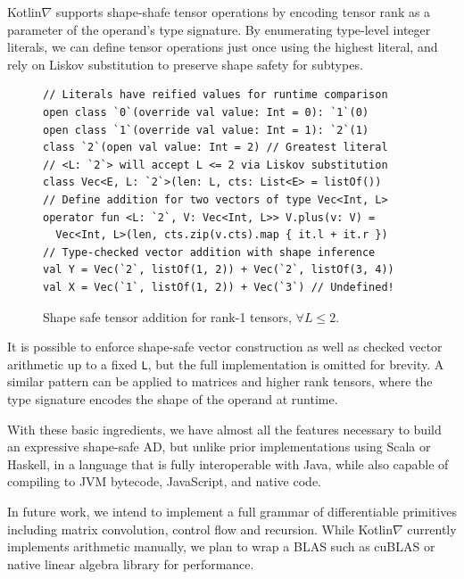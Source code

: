 \documentclass[12pt,initial,twoside,maitrise]{dms}
\numberwithin{equation}{section}
\numberwithin{table}{chapter}
\numberwithin{figure}{chapter}
\begin{document}
 Kotlin$\nabla$ supports shape-shafe tensor operations by encoding tensor rank as a parameter of the operand's type signature. By enumerating type-level integer literals, we can define tensor operations just once using the highest literal, and rely on Liskov substitution to preserve shape safety for subtypes.

\begin{figure}[!htb]
\begin{verbatim}
// Literals have reified values for runtime comparison
open class `0`(override val value: Int = 0): `1`(0)
open class `1`(override val value: Int = 1): `2`(1)
class `2`(open val value: Int = 2) // Greatest literal
// <L: `2`> will accept L <= 2 via Liskov substitution
class Vec<E, L: `2`>(len: L, cts: List<E> = listOf())
// Define addition for two vectors of type Vec<Int, L>
operator fun <L: `2`, V: Vec<Int, L>> V.plus(v: V) =
  Vec<Int, L>(len, cts.zip(v.cts).map { it.l + it.r })
// Type-checked vector addition with shape inference
val Y = Vec(`2`, listOf(1, 2)) + Vec(`2`, listOf(3, 4))
val X = Vec(`1`, listOf(1, 2)) + Vec(`3`) // Undefined!
\end{verbatim}
\caption{Shape safe tensor addition for rank-1 tensors, $\forall L\leq2.$}
\end{figure}

It is possible to enforce shape-safe vector construction as well as checked vector arithmetic up to a fixed \texttt{L}, but the full implementation is omitted for brevity. A similar pattern can be applied to matrices and higher rank tensors, where the type signature encodes the shape of the operand at runtime.

With these basic ingredients, we have almost all the features necessary to build an expressive shape-safe AD, but unlike prior implementations using Scala or Haskell, in a language that is fully interoperable with Java, while also capable of compiling to JVM bytecode, JavaScript, and native code.

In future work, we intend to implement a full grammar of differentiable primitives including matrix convolution, control flow and recursion. While Kotlin$\nabla$ currently implements arithmetic manually, we plan to wrap a BLAS such as cuBLAS or native linear algebra library for performance.
\end{document}
